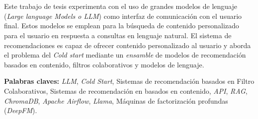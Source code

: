 \chapter*{\runtitulo}

\noindent Este trabajo de tesis experimenta con el uso de grandes modelos de lenguaje (\textit{Large language Models o LLM}) como interfaz de comunicación con el usuario final. Estos modelos se emplean para la búsqueda de contenido personalizado para el usuario en respuesta a consultas en lenguaje natural. El sistema de recomendaciones es capaz de ofrecer contenido personalizado al usuario y aborda el problema del \textit{Cold start} mediante un \textit{ensamble} de modelos de recomendación basados en contenido, filtros colaborativos y modelos de lenguaje.

\bigskip

\noindent\textbf{Palabras claves:} \textit{LLM}, \textit{Cold Start}, Sistemas de recomendación basados en Filtro Colaborativos, Sistemas de recomendación en basados en contenido, \textit{API}, \textit{RAG}, \textit{ChromaDB}, \textit{Apache Airflow}, \textit{Llama}, Máquinas de factorización profundas (\textit{DeepFM}).